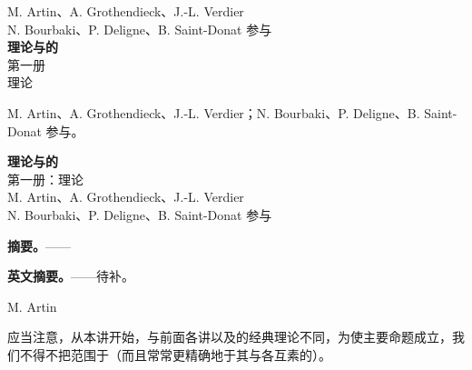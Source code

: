 \begin{center}
M. Artin、A. Grothendieck、J.-L. Verdier\\
N. Bourbaki、P. Deligne、B. Saint-Donat 参与\\[1em]
\textbf{理论与的}\\
第一册\\
理论
\end{center}
M. Artin、A. Grothendieck、J.-L. Verdier；N. Bourbaki、P. Deligne、B. Saint-Donat 参与。
\begin{center}
\textbf{理论与的}\\
第一册：理论\\
M. Artin、A. Grothendieck、J.-L. Verdier\\
N. Bourbaki、P. Deligne、B. Saint-Donat 参与
\end{center}
\textbf{摘要。}——

\textbf{英文摘要。}——待补。
\begin{center}M. Artin\end{center}
应当注意，从本讲开始，与前面各讲以及的经典理论不同，为使主要命题成立，我们不得不把范围于（而且常常更精确地于其与各互素的）。

